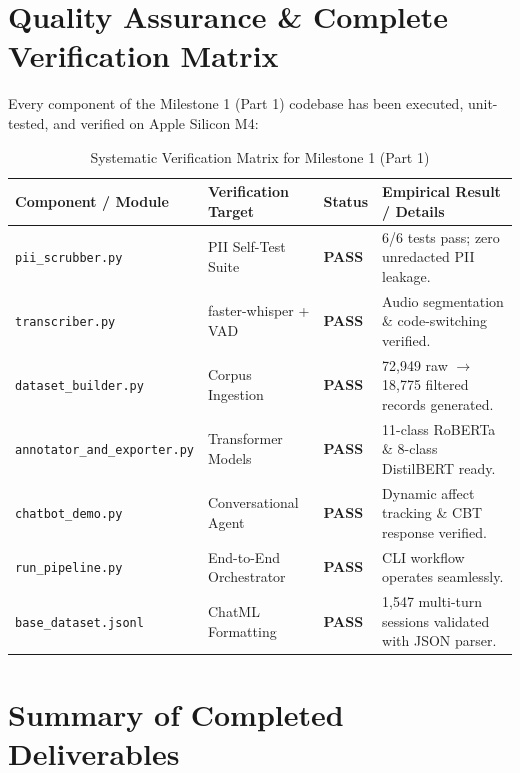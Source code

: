 \documentclass[11pt,a4paper]{article}
\begin{document}
\section{Quality Assurance \& Complete Verification Matrix}

Every component of the Milestone 1 (Part 1) codebase has been executed, unit-tested, and verified on Apple Silicon M4:

\begin{table}[H]
\centering
\small
\sffamily
\caption{Systematic Verification Matrix for Milestone 1 (Part 1)}
\label{tab:qa_matrix}
\begin{tabularx}{\linewidth}{p{3.8cm}p{2.8cm}p{1.8cm}X}
\toprule
\textbf{Component / Module} & \textbf{Verification Target} & \textbf{Status} & \textbf{Empirical Result / Details} \\
\midrule
\texttt{pii\_scrubber.py} & PII Self-Test Suite & \textcolor{successgreen}{\textbf{PASS}} & 6/6 tests pass; zero unredacted PII leakage. \\
\texttt{transcriber.py} & faster-whisper + VAD & \textcolor{successgreen}{\textbf{PASS}} & Audio segmentation \& code-switching verified. \\
\texttt{dataset\_builder.py} & Corpus Ingestion & \textcolor{successgreen}{\textbf{PASS}} & 72,949 raw $\to$ 18,775 filtered records generated. \\
\texttt{annotator\_and\_exporter.py} & Transformer Models & \textcolor{successgreen}{\textbf{PASS}} & 11-class RoBERTa \& 8-class DistilBERT ready. \\
\texttt{chatbot\_demo.py} & Conversational Agent & \textcolor{successgreen}{\textbf{PASS}} & Dynamic affect tracking \& CBT response verified. \\
\texttt{run\_pipeline.py} & End-to-End Orchestrator & \textcolor{successgreen}{\textbf{PASS}} & CLI workflow operates seamlessly. \\
\texttt{base\_dataset.jsonl} & ChatML Formatting & \textcolor{successgreen}{\textbf{PASS}} & 1,547 multi-turn sessions validated with JSON parser. \\
\bottomrule
\end{tabularx}
\end{table}

\section{Summary of Completed Deliverables}
\end{document}
